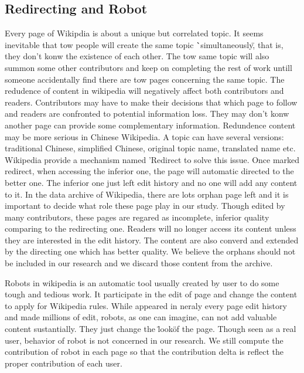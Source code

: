 \documentclass{elsarticle}
\begin{document}

\subsection{Redirecting and Robot}
\label{sec:redirecting-robot}

Every page of Wikipdia is about a unique but correlated topic. It
seems inevitable that tow people will create the same topic
\``simultaneously\", that is, they don't konw the existence of each
other. The tow same topic will also summon some other contributors and
keep on completing the rest of work untill someone accidentally find
there are tow pages concerning the same topic. The redudence of
content in wikipedia will negatively affect both contributors and
readers. Contributors may have to make their decisions that  which
page to follow and readers are confronted to potential information
loss. They may don't konw another page can provide some complementary
information. Redundence content may be more serious in Chinese
Wikipedia. A topic can have several versions: traditional Chinese,
simplified Chinese, original topic name, translated name
etc. Wikipedia provide a mechanism named 'Redirect  \cite{wikiredirect}
to solve this issue.  Once marked redirect, when accessing the inferior one, the page will
automatic directed to the better one. The inferior one just left edit
history and no one will add any content to it. In the data archive of
Wikipedia, there are lots orphan page left and it is important to
decide what role these page play in our study. Though edited by many
contributors, these pages are regared as incomplete, inferior quality
comparing to the redirecting one. Readers will no longer access its
content unless they are interested in the edit history. The content
are also converd and extended by the directing one which has better quality. We believe the
orphans should not be included in our research and we discard those
content from the archive.

Robots in wikipedia is an automatic tool usually created by user to do
some tough and tedious work. It participate in the edit of page and
change the content to apply for Wikipedia rules. While appeared in
neraly every page edit history and made millions of edit, robots, as
one can imagine, can not add valuable content sustantially. They just
change the \"look\" of the page. Though seen as a real user, behavior
of robot is not concerned in our research. We still compute the
contribution of robot in each page so that the contribution delta is
reflect the proper contribution of  each user.
\end{document}
